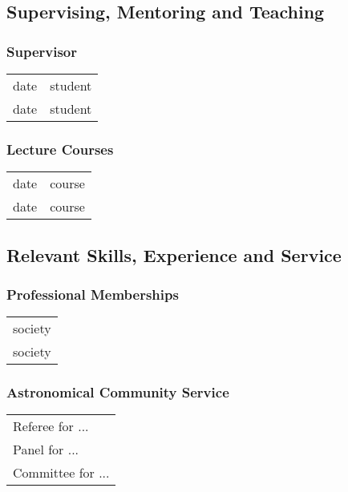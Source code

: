\subsection{Supervising, Mentoring and Teaching}

\subsubsection{Supervisor}

\begin{tabular}{rl}
    date & student \\
    date & student \\
\end{tabular}

\subsubsection{Lecture Courses}

\begin{tabular}{rl}
    date & course \\
    date & course \\
\end{tabular}


\subsection{Relevant Skills, Experience and Service}

\subsubsection{Professional Memberships}

\begin{tabular}{l}
    society \\
    society \\
\end{tabular}

\subsubsection{Astronomical Community Service}

\begin{tabular}{l}
    Referee for ... \\
    Panel for ... \\
    Committee for ... \\
\end{tabular}

